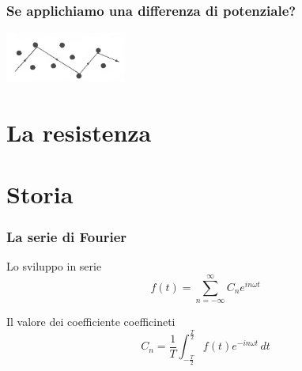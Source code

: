 		
		\begin{frame}[c]\frametitle{Se applichiamo una differenza di potenziale?}
		    
			\includegraphics[width=4cm]{./img/path.png}
		
		\end{frame}

	\section{La resistenza} %
	\label{sec:la_resistenza}
	

	\section{Storia} %
		\label{sec:il_formalismo_di_fourier}
	
		\begin{frame}[c]\frametitle{La serie di Fourier}

		\begin{block}{Lo sviluppo in serie}
			\begin{equation}
		    	\label{eq:serie_di_fourier}
				f\left(t\right)=\sum_{n=-\infty}^{\infty} C_n e^{i n \omega t}
			\end{equation}
		\end{block}
		\pause
		\begin{block}{Il valore dei coefficiente coefficineti}
			\begin{equation}
			    \label{eq:coefficienti}
					C_n= \frac{1}{T} \int_{-\frac{T}{2}}^{\frac{T}{2}} f\left(t\right) e^{-i n \omega t} \,dt
			\end{equation}
		\end{block}

		\end{frame}
		
